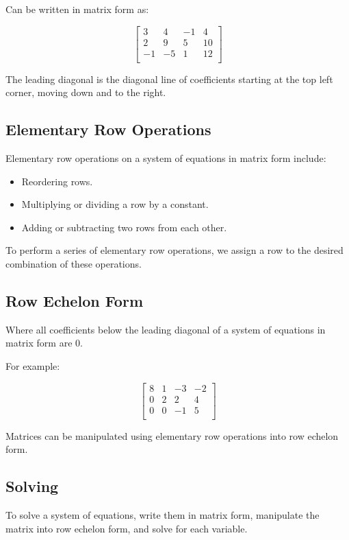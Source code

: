 \documentclass[a4paper,11pt]{report}
\begin{document}
Can be written in matrix form as:

$$
\begin{bmatrix}
 3 &  4 & -1 & 4  \\
 2 &  9 &  5 & 10 \\
-1 & -5 &  1 & 12 \\
\end{bmatrix}
$$

The leading diagonal is the diagonal line of coefficients starting at the top
left corner, moving down and to the right.

\subsection{Elementary Row Operations}

Elementary row operations on a system of equations in matrix form include:

\begin{itemize}
\item Reordering rows.
\item Multiplying or dividing a row by a constant.
\item Adding or subtracting two rows from each other.
\end{itemize}

To perform a series of elementary row operations, we assign a row to the desired
combination of these operations.

\subsection{Row Echelon Form}

Where all coefficients below the leading diagonal of a system of equations in
matrix form are 0.

For example:

$$
\begin{bmatrix}
8 & 1 & -3 & -2 \\
0 & 2 &  2 &  4 \\
0 & 0 & -1 &  5 \\
\end{bmatrix}
$$

Matrices can be manipulated using elementary row operations into row echelon
form.

\subsection{Solving}

To solve a system of equations, write them in matrix form, manipulate the matrix
into row echelon form, and solve for each variable.
\end{document}
